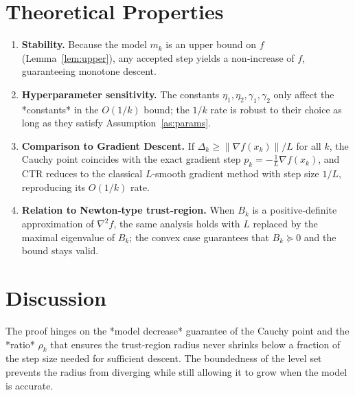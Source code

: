 \documentclass{article}
\begin{document}
\section*{Theoretical Properties}
\begin{enumerate}[label=\arabic*)]
\item \textbf{Stability.}  
Because the model $m_k$ is an upper bound on $f$ (Lemma~\ref{lem:upper}), any accepted step yields a non‑increase of $f$, guaranteeing monotone descent.

\item \textbf{Hyperparameter sensitivity.}  
The constants $\eta_1,\eta_2,\gamma_1,\gamma_2$ only affect the *constants* in the $O(1/k)$ bound; the $1/k$ rate is robust to their choice as long as they satisfy Assumption~\ref{as:params}.

\item \textbf{Comparison to Gradient Descent.}  
If $\Delta_k\ge \|\nabla f(x_k)\|/L$ for all $k$, the Cauchy point coincides with the exact gradient step $p_k=-\frac{1}{L}\nabla f(x_k)$, and CTR reduces to the classical $L$‑smooth gradient method with step size $1/L$, reproducing its $O(1/k)$ rate.

\item \textbf{Relation to Newton‑type trust‑region.}  
When $B_k$ is a positive‑definite approximation of $\nabla^2 f$, the same analysis holds with $L$ replaced by the maximal eigenvalue of $B_k$; the convex case guarantees that $B_k\succeq 0$ and the bound stays valid.
\end{enumerate}

\section*{Discussion}
The proof hinges on the *model decrease* guarantee of the Cauchy point and the *ratio* $\rho_k$ that ensures the trust‑region radius never shrinks below a fraction of the step size needed for sufficient descent. The boundedness of the level set prevents the radius from diverging while still allowing it to grow when the model is accurate.
\end{document}
